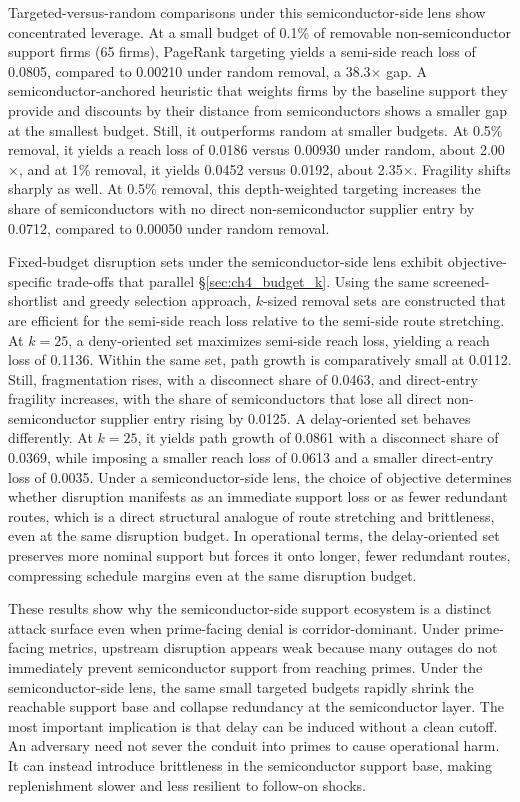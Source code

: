 Targeted-versus-random comparisons under this semiconductor-side lens show concentrated leverage. At a small budget of 0.1\% of removable non-semiconductor support firms (65 firms), PageRank targeting yields a semi-side reach loss of 0.0805, compared to 0.00210 under random removal, a 38.3$\times$ gap. A semiconductor-anchored heuristic that weights firms by the baseline support they provide and discounts by their distance from semiconductors shows a smaller gap at the smallest budget. Still, it outperforms random at smaller budgets. At 0.5\% removal, it yields a reach loss of 0.0186 versus 0.00930 under random, about 2.00$\times$, and at 1\% removal, it yields 0.0452 versus 0.0192, about 2.35$\times$. Fragility shifts sharply as well. At 0.5\% removal, this depth-weighted targeting increases the share of semiconductors with no direct non-semiconductor supplier entry by 0.0712, compared to 0.00050 under random removal.

Fixed-budget disruption sets under the semiconductor-side lens exhibit objective-specific trade-offs that parallel \S\ref{sec:ch4_budget_k}. Using the same screened-shortlist and greedy selection approach, $k$-sized removal sets are constructed that are efficient for the semi-side reach loss relative to the semi-side route stretching. At $k=25$, a deny-oriented set maximizes semi-side reach loss, yielding a reach loss of 0.1136. Within the same set, path growth is comparatively small at 0.0112. Still, fragmentation rises, with a disconnect share of 0.0463, and direct-entry fragility increases, with the share of semiconductors that lose all direct non-semiconductor supplier entry rising by 0.0125. A delay-oriented set behaves differently. At $k=25$, it yields path growth of 0.0861 with a disconnect share of 0.0369, while imposing a smaller reach loss of 0.0613 and a smaller direct-entry loss of 0.0035. Under a semiconductor-side lens, the choice of objective determines whether disruption manifests as an immediate support loss or as fewer redundant routes, which is a direct structural analogue of route stretching and brittleness, even at the same disruption budget. In operational terms, the delay-oriented set preserves more nominal support but forces it onto longer, fewer redundant routes, compressing schedule margins even at the same disruption budget.

These results show why the semiconductor-side support ecosystem is a distinct attack surface even when prime-facing denial is corridor-dominant. Under prime-facing metrics, upstream disruption appears weak because many outages do not immediately prevent semiconductor support from reaching primes. Under the semiconductor-side lens, the same small targeted budgets rapidly shrink the reachable support base and collapse redundancy at the semiconductor layer. The most important implication is that delay can be induced without a clean cutoff. An adversary need not sever the conduit into primes to cause operational harm. It can instead introduce brittleness in the semiconductor support base, making replenishment slower and less resilient to follow-on shocks.

